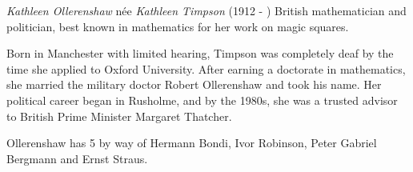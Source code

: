 \documentclass[12pt]{article}
\begin{document}

\emph{Kathleen Ollerenshaw} n\'ee \emph{Kathleen Timpson} (1912 - ) British mathematician and politician, best known in mathematics for her work on magic squares.

Born in Manchester with limited hearing, Timpson was completely deaf by the time she applied to Oxford University. After earning a doctorate in mathematics, she married the military doctor Robert Ollerenshaw and took his name. Her political career began in Rusholme, and by the 1980s, she was a trusted advisor to British Prime Minister Margaret Thatcher.

Ollerenshaw has  5 by way of Hermann Bondi, Ivor Robinson, Peter Gabriel Bergmann and Ernst Straus.
\end{document}

